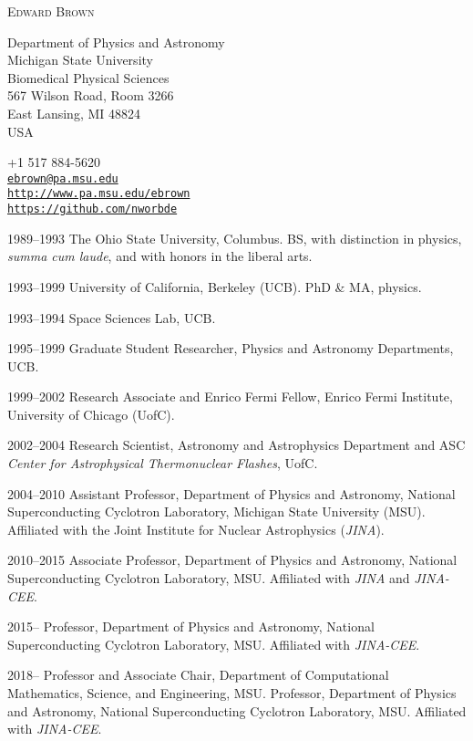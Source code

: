 \documentclass[11pt]{vitae}
\begin{document}
\thispagestyle{empty}
{\LARGE\scshape Edward Brown}

\parbox[t]{186pt}{%
Department of Physics and Astronomy\\
Michigan State University\\
Biomedical Physical Sciences\\
567 Wilson Road, Room 3266\\
East Lansing, MI 48824\\
USA
}
\hfill
\parbox[t]{220pt}{%
+1 517 884-5620\\
\href{mailto:ebrown@pa.msu.edu}{\texttt{ebrown@pa.msu.edu}}\\
\href{http://www.pa.msu.edu/~ebrown}{\texttt{http://www.pa.msu.edu/ebrown}}\\
\href{https://github.com/nworbde}{\texttt{https://github.com/nworbde}}\\
}

\vspace{4.0ex plus1ex minus0.5ex}

\begin{chronlist}
\item[1989--1993] The Ohio State University, Columbus.  BS,
  with distinction in physics, \emph{summa cum laude}, and with honors
  in the liberal arts.

\item[1993--1999] University of California, Berkeley (UCB). PhD \& MA, physics.
\end{chronlist}

\begin{chronlist}
\item[1993--1994] Space Sciences Lab, UCB. 
\item[1995--1999] Graduate Student Researcher, Physics and Astronomy Departments, UCB. 
\item[1999--2002] Research Associate and Enrico Fermi Fellow, Enrico
  Fermi Institute, University of Chicago (UofC).  
\item[2002--2004] Research Scientist, Astronomy and Astrophysics
  Department and ASC \emph{Center for Astrophysical Thermonuclear
    Flashes},  UofC.  
\item[2004--2010] Assistant Professor, Department of Physics and Astronomy, National Superconducting Cyclotron Laboratory, Michigan State University (MSU). Affiliated with the Joint Institute for Nuclear Astrophysics (\emph{JINA}).
\item[2010--2015] Associate Professor, Department of Physics and Astronomy, National Superconducting Cyclotron Laboratory, MSU. Affiliated with \emph{JINA} and \emph{JINA-CEE}.
\item[2015--] Professor, Department of Physics and Astronomy, National Superconducting Cyclotron Laboratory, MSU. Affiliated with \emph{JINA-CEE}.
\item[2018--] Professor and Associate Chair, Department of Computational Mathematics, Science, and Engineering, MSU. Professor, Department of Physics and Astronomy, National Superconducting Cyclotron Laboratory, MSU. Affiliated with \emph{JINA-CEE}.
\end{chronlist}
\end{document}
